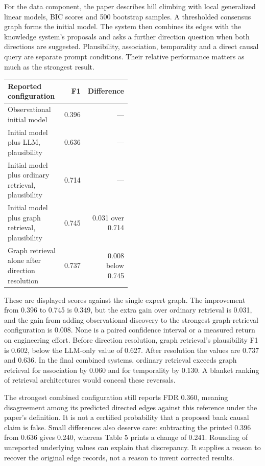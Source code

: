 For the data component, the paper describes hill climbing with local generalized
linear models, BIC scores and 500 bootstrap samples. A thresholded consensus graph
forms the initial model. The system then combines its edges with the knowledge
system's proposals and asks a further direction question when both directions
are suggested. Plausibility, association, temporality and a direct causal query
are separate prompt conditions. Their relative performance matters as much as
the strongest result. \cite{exec22_domain_lin}

\begin{center}
\begin{tabular}{p{0.48\linewidth}rr}
\hline
Reported configuration & F1 & Difference \\
\hline
Observational initial model & 0.396 & --- \\
Initial model plus LLM, plausibility & 0.636 & --- \\
Initial model plus ordinary retrieval, plausibility & 0.714 & --- \\
Initial model plus graph retrieval, plausibility & 0.745 & 0.031 over 0.714 \\
Graph retrieval alone after direction resolution & 0.737 & 0.008 below 0.745 \\
\hline
\end{tabular}
\end{center}

These are displayed scores against the single expert graph. The improvement
from 0.396 to 0.745 is 0.349, but the extra gain over ordinary retrieval is 0.031,
and the gain from adding observational discovery to the strongest graph-retrieval
configuration is 0.008. None is a paired confidence interval or a measured return
on engineering effort. Before direction resolution, graph retrieval's plausibility
F1 is 0.602, below the LLM-only value of 0.627. After resolution the values are
0.737 and 0.636. In the final combined systems, ordinary retrieval exceeds graph
retrieval for association by 0.060 and for temporality by 0.130. A blanket ranking
of retrieval architectures would conceal these reversals. \cite{exec22_domain_lin,exec22_domain_reference}

The strongest combined configuration still reports FDR 0.360, meaning disagreement
among its predicted directed edges against this reference under the paper's
definition. It is not a certified probability that a proposed bank causal claim
is false. Small differences also deserve care: subtracting the printed 0.396
from 0.636 gives 0.240, whereas Table 5 prints a change of 0.241. Rounding of
unreported underlying values can explain that discrepancy. It supplies a reason
to recover the original edge records, not a reason to invent corrected results.

